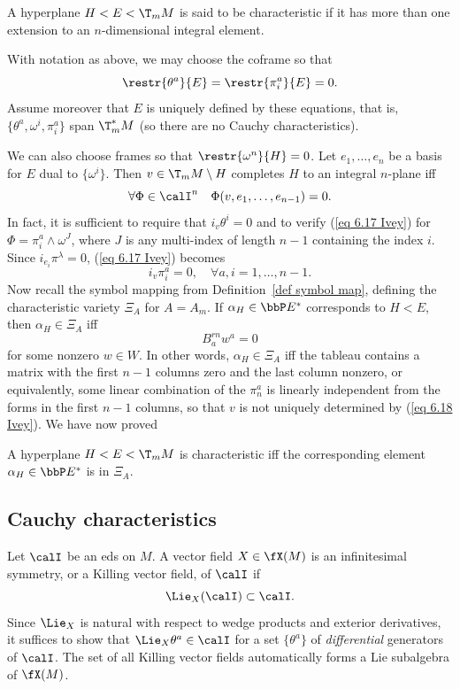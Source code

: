 \begin{defn}
    A hyperplane $H<E<\T_mM$ is said to be characteristic if it has more than one extension to an $n$-dimensional integral element.
\end{defn}

With notation as above, we may choose the coframe so that 
\[\restr{\theta^a}{E}=\restr{\pi^a_i}{E}=0.\]
Assume moreover that $E$ is uniquely defined by these equations, that is, $\{\theta^a,\omega^i,\pi^a_i\}$ span $\T_m^\ast M$ (so there are no Cauchy characteristics).

We can also choose frames so that $\restr{\omega^n}{H}=0$. Let $e_1,\ldots,e_n$ be a basis for $E$ dual to $\{\omega^i\}$. Then $v\in \T_mM\setminus H$ completes $H$ to an integral $n$-plane iff 
\[\forall\Phi \in\calI^n\quad \Phi (v,e_1,\ldots,e_{n-1})=0.\label{eq 6.17 Ivey}\]
In fact, it is sufficient to require that $i_v \theta^i=0$ and to verify (\ref{eq 6.17 Ivey}) for $\Phi=\pi^a_i\wedge \omega^J$, where $J$ is any multi-index of length $n-1$ containing the index $i$. Since $i_{e_i}\pi^\lambda=0$, (\ref{eq 6.17 Ivey}) becomes 
\[i_v\pi^a_i=0,\quad  \forall a, i=1,\ldots,n-1.\label{eq 6.18 Ivey}\]
Now recall the symbol mapping from Definition~\ref{def symbol map}, defining the characteristic variety $\Xi_A$ for $A=A_m$. If $\alpha_H\in \bbP E^\ast$ corresponds to $H<E$, then $\alpha_H\in \Xi_A$ iff 
\[B^{rn}_a w^a=0\]
for some nonzero $w\in W$. In other words, $\alpha_H\in\Xi_A$ iff the tableau contains a matrix with the first $n-1$ columns zero and the last column nonzero, or equivalently, some linear combination of the $\pi^a_n$ is linearly independent from the forms in the first $n-1$ columns, so that $v$ is not uniquely determined by (\ref{eq 6.18 Ivey}). We have now proved 
\begin{thm}
    A hyperplane $H<E<\T_mM$ is characteristic iff the corresponding element $\alpha_H\in\bbP E^\ast$ is in $\Xi_A$.
\end{thm}








\subsection{Cauchy characteristics}


\begin{defn}
    Let $\calI$ be an \gls{eds} on $M$. A vector field $X\in\fX(M)$ is an infinitesimal symmetry, or a Killing vector field, of $\calI$ if 
    \[\Lie_X (\calI)\subset \calI.\]
    Since $\Lie_X$ is natural with respect to wedge products and exterior derivatives, it suffices to show that $\Lie_X \theta^a\in \calI$ for a set $\{\theta^a\}$ of \emph{differential} generators of $\calI$. The set of all Killing vector fields automatically forms a Lie subalgebra of $\fX(M)$.
\end{defn}

